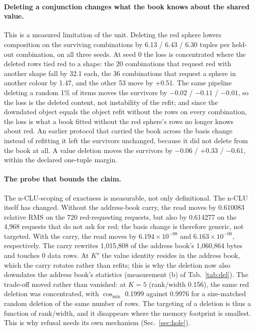 \documentclass{article} %
\newcommand{\sci}[2]{\ensuremath{#1\times10^{#2}}}
\newcommand{\Kstar}{\ensuremath{K^{\star}}}
\begin{document}
\paragraph{Deleting a conjunction changes what the book knows about the shared value.} This is a
measured limitation of the unit. Deleting the red sphere lowers composition on the surviving combinations
by 6.13 / 6.43 / 6.30 tuples per held-out combination, on all three seeds. At seed 0 the loss is concentrated where %
the deleted rows tied red to a shape: the 20 combinations that request red with another shape fall by %
32.1 each, the 36 combinations that request a sphere in another colour by 1.47, and the other 53 move %
by +0.51. The same pipeline deleting a random 1\% of items moves the survivors by $-0.02$ / %
$-0.11$ / $-0.01$, so the loss is the deleted content, not instability of the refit; and since the %
downdated object equals the object refit without the rows on every combination, the loss is what a book
fitted without the red sphere's rows no longer knows about red. An earlier protocol that carried the
book across the basis change instead of refitting it left the survivors unchanged, because it did
not delete from the book at all. A value deletion moves the survivors by $-0.06$ / $+0.33$ / %
$-0.61$, within the declared one-tuple margin. %

\paragraph{The probe that bounds the claim.} The n-CLU-scoping of exactness is measurable, not
only definitional.
The n-CLU itself has changed. Without the address-book carry, the read moves by 0.610083
relative RMS on the 720 red-requesting requests, but also by 0.614277 on the 4,968 requests
that do not ask for red; the basis change is therefore generic, not targeted. With the carry,
the read moves by \sci{6.194}{-08} and \sci{6.163}{-08}, respectively. The carry rewrites
1,015,808 of the address book's 1,060,864 bytes and touches 0 data rows. %
At $\Kstar$ the value identity
resides in the address book, which the carry rotates rather than refits; this is why the deletion
now also downdates the address book's statistics (measurement (b) of Tab.~\ref{tab:del}). The trade-off moved
rather than vanished: at $K=5$ (rank/width 0.156), the same red deletion was concentrated, with
$\cos_{\min}$ 0.1999 against 0.9976 for a size-matched random deletion of the same number of
rows. %
The targeting of a deletion is thus a function of rank/width, and it disappears where the memory footprint
is smallest. This is why refusal needs its own mechanism (Sec.~\ref{sec:hole}).
\end{document}
